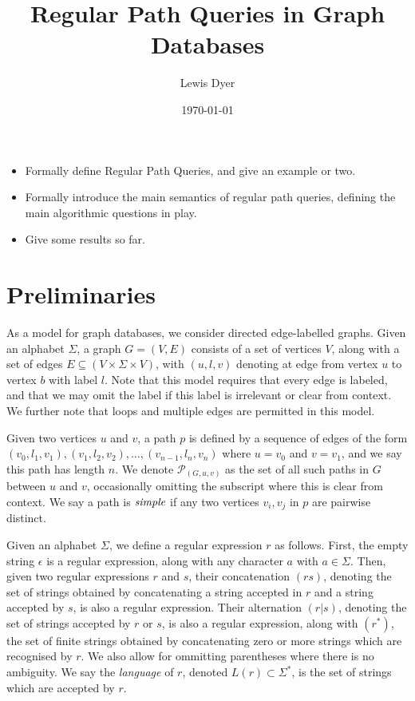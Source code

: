 \documentclass{article}
\title{Regular Path Queries in Graph Databases}
\date{\today}
\author{Lewis Dyer}
\begin{document}
\maketitle

\begin{itemize}
    \item Formally define Regular Path Queries, and give an example or two.
    \item Formally introduce the main semantics of regular path queries, defining the main algorithmic questions in play.
    \item Give some results so far.
\end{itemize}

\section{Preliminaries}
\label{sec:prelims}

As a model for graph databases, we consider directed edge-labelled graphs. Given an alphabet $\Sigma$, a graph $G = (V,E)$ consists of a set of vertices $V$, along with a set of edges $E \subseteq (V \times \Sigma \times V)$, with $(u, l, v)$ denoting at edge from vertex $u$ to vertex $b$ with label $l$. Note that this model requires that every edge is labeled, and that we may omit the label if this label is irrelevant or clear from context. We further note that loops and multiple edges are permitted in this model.

Given two vertices $u$ and $v$, a path $p$ is defined by a sequence of edges of the form $(v_0, l_1, v_1), (v_1, l_2, v_2), \dots, (v_{n-1}, l_n, v_n)$ where $u = v_0$ and $v = v_1$, and we say this path has length $n$. We denote $\mathcal{P}_(G, u ,v)$ as the set of all such paths in $G$ between $u$ and $v$, occasionally omitting the subscript where this is clear from context.  We say a path is $\emph{simple}$ if any two vertices $v_i, v_j$ in $p$ are pairwise distinct.

Given an alphabet $\Sigma$, we define a regular expression $r$ as follows. First, the empty string $\epsilon$ is a regular expression, along with any character $a$ with $a \in \Sigma$. Then, given two regular expressions $r$ and $s$, their concatenation $(rs)$, denoting the set of strings obtained by concatenating a string accepted in $r$ and a string accepted by $s$, is also a regular expression. Their alternation $(r | s)$, denoting the set of strings accepted by $r$ or $s$, is also a regular expression, along with $(r^*)$, the set of finite strings obtained by concatenating zero or more strings which are recognised by $r$. We also allow for ommitting parentheses where there is no ambiguity. We say the \emph{language} of $r$, denoted $L(r) \subset \Sigma^*$, is the set of strings which are accepted by $r$.
\end{document}
